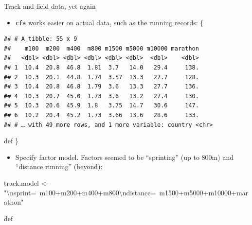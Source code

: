 \documentclass[ignorenonframetext,]{beamer}
\newenvironment{Shaded}{\begin{snugshade}}{\end{snugshade}}
\newcommand{\CharTok}[1]{\textcolor[rgb]{0.31,0.60,0.02}{#1}}
\newcommand{\DataTypeTok}[1]{\textcolor[rgb]{0.13,0.29,0.53}{#1}}
\newcommand{\DecValTok}[1]{\textcolor[rgb]{0.00,0.00,0.81}{#1}}
\newcommand{\KeywordTok}[1]{\textcolor[rgb]{0.13,0.29,0.53}{\textbf{#1}}}
\newcommand{\NormalTok}[1]{#1}
\newcommand{\OperatorTok}[1]{\textcolor[rgb]{0.81,0.36,0.00}{\textbf{#1}}}
\newcommand{\StringTok}[1]{\textcolor[rgb]{0.31,0.60,0.02}{#1}}
\providecommand{\tightlist}{%
  \setlength{\itemsep}{0pt}\setlength{\parskip}{0pt}}
\begin{document}
\begin{frame}[fragile]{Track and field data, yet again}
\protect\hypertarget{track-and-field-data-yet-again}{}

\begin{itemize}
\tightlist
\item
  \texttt{cfa} works easier on actual data, such as the running records:
  \{\small 
\end{itemize}

\begin{Shaded}
\end{Shaded}

\begin{verbatim}
## # A tibble: 55 x 9
##    m100  m200  m400  m800 m1500 m5000 m10000 marathon
##   <dbl> <dbl> <dbl> <dbl> <dbl> <dbl>  <dbl>    <dbl>
## 1  10.4  20.8  46.8  1.81  3.7   14.0   29.4     138.
## 2  10.3  20.1  44.8  1.74  3.57  13.3   27.7     128.
## 3  10.4  20.8  46.8  1.79  3.6   13.3   27.7     136.
## 4  10.3  20.7  45.0  1.73  3.6   13.2   27.4     130.
## 5  10.3  20.6  45.9  1.8   3.75  14.7   30.6     147.
## 6  10.2  20.4  45.2  1.73  3.66  13.6   28.6     133.
## # … with 49 more rows, and 1 more variable: country <chr>
\end{verbatim}

def \}

\begin{itemize}
\tightlist
\item
  Specify factor model. Factors seemed to be ``sprinting'' (up to 800m)
  and ``distance running'' (beyond):
\end{itemize}

\begin{Shaded}
\begin{Highlighting}[]
\NormalTok{track.model <-}\StringTok{ "}\CharTok{\textbackslash{}n}\StringTok{sprint=~m100+m200+m400+m800}\CharTok{\textbackslash{}n}\StringTok{distance=~m1500+m5000+m10000+marathon"}
\end{Highlighting}
\end{Shaded}

def

\end{frame}
\end{document}
